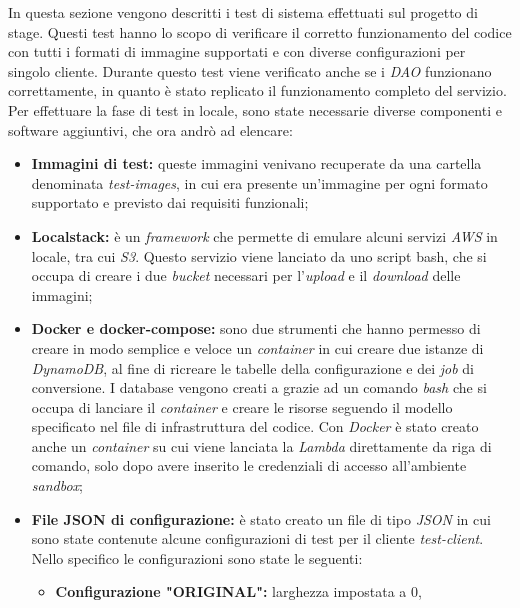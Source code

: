 In questa sezione vengono descritti i test di sistema effettuati sul progetto di
stage. Questi test hanno lo scopo di verificare il corretto funzionamento del
codice con tutti i formati di immagine supportati e con diverse configurazioni
per singolo cliente. Durante questo test viene verificato anche se i \emph{DAO}
funzionano correttamente, in quanto è stato replicato il funzionamento completo
del servizio. \\
Per effettuare la fase di test in locale, sono state necessarie diverse
componenti e software aggiuntivi, che ora andrò ad elencare:
\begin{itemize}
    \item \textbf{Immagini di test:} queste immagini venivano recuperate da una
          cartella denominata \emph{test-images}, in cui era presente un'immagine per
          ogni formato supportato e previsto dai requisiti funzionali;
    \item \textbf{Localstack:} è un \emph{framework} che permette di emulare
          alcuni servizi \emph{AWS} in locale, tra cui \emph{S3}. Questo servizio viene lanciato da uno script
          \glsfirstoccur\gls{bash}, che si occupa di creare i due \emph{bucket}
          necessari per l'\emph{upload} e il \emph{download} delle immagini; \cite{localstack}
    \item \textbf{Docker e docker-compose:} sono due strumenti che hanno
          permesso di creare in modo semplice e veloce un \emph{container} in cui
          creare due istanze di \emph{DynamoDB}, al fine di ricreare le tabelle della
          configurazione e dei \emph{job} di conversione. I database vengono creati a
          grazie ad un comando \emph{bash} che si occupa di lanciare il
          \emph{container} e creare le risorse seguendo il modello specificato nel
          file di infrastruttura del codice. Con \emph{Docker} è stato creato
          anche un \emph{container} su cui viene lanciata la \emph{Lambda}
          direttamente da riga di comando, solo dopo avere inserito le
          credenziali di accesso all'ambiente \emph{sandbox};
    \item \textbf{File JSON di configurazione:} è stato creato un file di tipo
          \emph{JSON} in cui sono state contenute alcune configurazioni di test per il
          cliente \emph{test-client}. Nello specifico le configurazioni sono state le
          seguenti:
          \begin{itemize}
              \item \textbf{Configurazione "ORIGINAL":} larghezza impostata a $0$,

\end{itemize}
\end{itemize}

